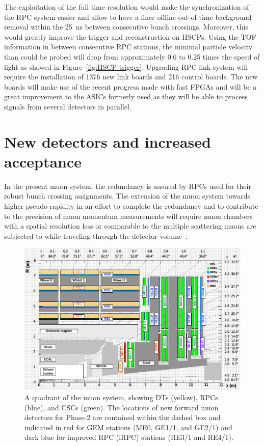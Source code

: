 	The exploitation of the full time resolution would make the synchronization of the RPC system easier and allow to have a finer offline out-of-time background removal within the \SI{25}{ns} between consecutive bunch crossings. Moreover, this would greatly improve the trigger and reconstruction on HSCPs. Using the TOF information in between consecutive RPC stations, the minimal particle velocity than could be probed will drop from approximately 0.6 to 0.25 times the speed of light as showed in Figure~\ref{fig:HSCP-trigger}. Upgrading RPC link system will require the installation of 1376 new link boards and 216 control boards. The new boards will make use of the recent progress made with fast FPGAs and will be a great improvement to the ASICs formerly used as they will be able to process signals from several detectors in parallel.

\section{New detectors and increased acceptance}
\label{chapt4:sec:GEMRPC}

	In the present muon system, the redundancy is assured by RPCs used for their robust bunch crossing assignments. The extension of the muon system towards higher pseudo-rapidity in an effort to complete the redundancy and to contribute to the precision of muon momentum measurements will require muon chambers with a spatial resolution less or comparable to the multiple scattering muons are subjected to while traveling through the detector volume~\cite{MUONTDR}. 
	
	\begin{figure}[H]
		\centering
		\includegraphics[width=\linewidth]{fig/chapt4/Phase2_Muon_quadrant.pdf}
		\caption{\label{fig:P2Quadrant} A quadrant of the muon system, showing DTs (yellow), RPCs (blue), and CSCs (green). The locations of new forward muon detectors for Phase-2 are contained within the dashed box and indicated in red for GEM stations (ME0, GE1/1, and GE2/1) and dark blue for improved RPC (iRPC) stations (RE3/1 and RE4/1).}
	\end{figure}
	
